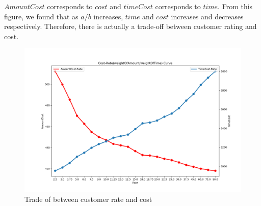 \documentclass[11pt, a4paper]{article} %
\begin{document}
	$AmountCost$ corresponds to $cost$ and $timeCost$ corresponds to $time$. From this figure, we found that as $a/b$ increases, $time$ and $cost$ increases and decreases respectively. Therefore, there is actually a trade-off between customer rating and cost.
	\begin{figure}
		\centering
		\includegraphics[width=\linewidth]{figure/tradeoff.png}
		\caption{Trade of between customer rate and cost}
		\label{fig:tradeoff}
	\end{figure}
\end{document}

